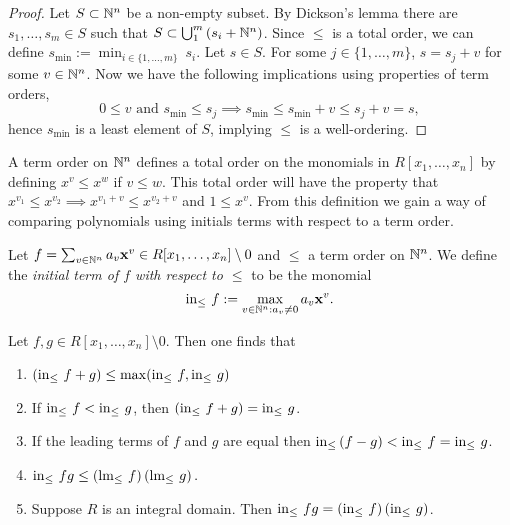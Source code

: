 \begin{proof}
    Let $S\subset \mathbb{N}^n$ be a non-empty subset. By Dickson's lemma there are $s_1,\dots,s_m\in S$ such that $S\subset \bigcup_1^m \left(s_i+\mathbb{N}^n\right)$. Since $\leq$ is a total order, we can define $s_{\min} := \min_{i\in\{1,\dots,m\}}\ s_i$. Let $s\in S$. For some $j\in \{1,\dots,m\}$, $s= s_j + v$ for some $v\in \mathbb{N}^n$. Now we have the following implications using properties of term orders,
    $$0\leq v \text{ and } s_{\min}\leq s_j \implies s_{\min} \leq s_{\min}+v \leq s_j + v = s,$$
    hence $s_{\min}$ is a least element of $S$, implying $\leq$ is a well-ordering. 
\end{proof}
A term order on $\mathbb{N}^n$ defines a total order on the monomials in 
$R[x_1,\dots,x_n]$ by defining $x^v\leq x^w$ if $v\leq w$. This total order will have the property that $x^{v_1} \leq x^{v_2}\implies x^{v_1+v}\leq x^{v_2+v}$ and $1 \leq x^v$. From this definition we gain a way of comparing polynomials using initials terms with respect to a term order. 
\begin{definition}
    Let $f=\sum_{v\in\mathbb{N}^n} a_v\mathbf{x}^v\in R[x_1,\dots,x_n]\setminus 0$ and $\leq$ a term order on $\mathbb{N}^n$. We define the \textit{initial term of $f$ with respect to $\leq$} to be the monomial
    $$\mathrm{in}_\leq\ f := \max_{v\in \mathbb{N}^n : a_v \neq 0} a_v\mathbf{x}^v.$$
\end{definition}
\begin{lemma}\label{InitialTermProperties}
    Let $f,g\in R[x_1,\dots,x_n]\setminus 0$. Then one finds that
    \begin{enumerate}
        \item $\left(\mathrm{in}_\leq \ f+g\right) \leq \max(\mathrm{in}_\leq\ f, \mathrm{in}_\leq\ g)$
        \item If $\mathrm{in}_\leq \ f< \mathrm{in}_\leq\ g$, then $\left(\inn\ f + g\right) = \inn\ g$.
        \item If the leading terms of $f$ and $g$ are equal then $\mathrm{in}_\leq  \left(f-g \right) < \mathrm{in}_\leq\ f = \mathrm{in}_\leq\ g$.
        \item $\inn\ fg\leq \left(\text{lm}_\leq\ f\right)\left( \text{lm}_\leq\ g\right).$ 
        \item Suppose $R$ is an integral domain. Then $\mathrm{in}_\leq\ fg = \left(\mathrm{in}_\leq\ f\right)\left(\mathrm{in}_\leq\ g\right)$.
    \end{enumerate}
\end{lemma}
